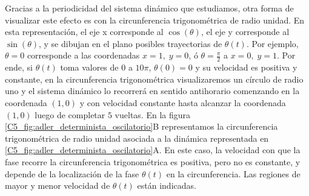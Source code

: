\documentclass[./main.tex]{subfiles}
\begin{document}
Gracias a la periodicidad del sistema dinámico que estudiamos, otra forma de visualizar este efecto es con la circunferencia trigonométrica de radio unidad. En esta representación, el eje x corresponde al $\cos{(\theta)}$, el eje y corresponde al $\sin{(\theta)}$, y se dibujan en el plano posibles trayectorias de $\theta(t)$. Por ejemplo, $\theta = 0$ corresponde a las coordenadas $x=1, \; y=0$, ó $\theta = \frac{\pi}{2}$ a $x=0, \; y=1$. Por ende, si $\theta(t)$ toma valores de $0$ a $10\pi$, $\theta(0) = 0$ y su velocidad es positiva y constante, en la circunferencia trigonométrica visualizaremos un círculo de radio uno y el sistema dinámico lo recorrerá en sentido antihorario comenzando en la coordenada $(1,0)$ y con velocidad constante hasta alcanzar la coordenada $(1,0)$ luego de completar $5$ vueltas. En la figura \ref{C5_fig:adler_determinista_oscilatorio}B representamos la circunferencia trigonométrica de radio unidad asociada a la dinámica representada en \ref{C5_fig:adler_determinista_oscilatorio}A. En este caso, la velocidad con que la fase recorre la circunferencia trigonométrica es positiva, pero no es constante, y depende de la localización de la fase $\theta(t)$ en la circunferencia. Las regiones de mayor y menor velocidad de $\theta(t)$ están indicadas. 
\end{document}
